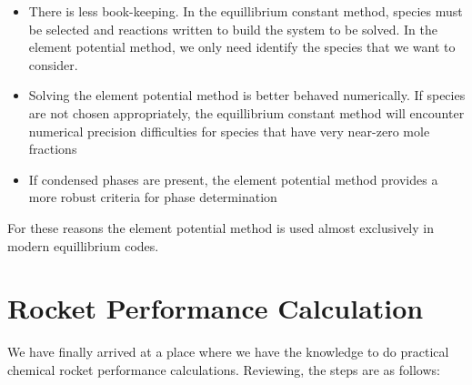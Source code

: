 \documentclass[twocolumn]{memoir} %
\begin{document}
\begin{itemize}
    \item There is less book-keeping.  In the equillibrium constant method, species must be selected and reactions
        written to build the system to be solved.  In the element potential method, we only need identify
        the species that we want to consider.
    \item Solving the element potential method is better behaved numerically.  If species are not chosen 
        appropriately, the equillibrium constant method will encounter numerical precision difficulties for species
        that have very near-zero mole fractions
    \item If condensed phases are present, the element potential method provides a more robust criteria
        for phase determination
\end{itemize}

For these reasons the element potential method is used almost exclusively in modern equillibrium codes.

\section{Rocket Performance Calculation}
We have finally arrived at a place where we have the knowledge to do practical chemical rocket performance 
calculations.  Reviewing, the steps are as follows:
\end{document}
